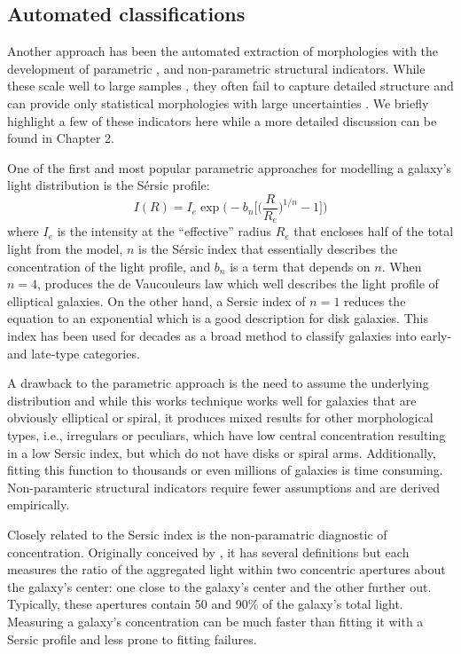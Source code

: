 \subsection{Automated classifications}
Another approach has been the automated extraction of morphologies with the development of parametric \citep{Sersic1968, Odewahn2002, Peng2002}, and non-parametric 
\citep{Abraham1994, 
	   Conselice2003, 
	   Abraham2003, 
	   Lotz2004,  
	   Freeman2013} 
structural indicators. While these scale well to large samples 
\citep[e.g.,][]{Simard2011, 
			Griffith2012, 
			Casteels2014, 
			Holwerda2014, 
			Meert2016}, 
they often fail to capture detailed structure and can provide only statistical morphologies with large uncertainties \cite[e.g.,][]{Abraham1996, Bershady2000}. We briefly highlight a few of these indicators here while a more detailed discussion can be found in Chapter 2. 

One of the first and most popular parametric approaches for modelling a galaxy's light distribution is the S\'ersic profile:
\begin{equation}
I(R) = I_e \exp \Big(-b_n\Big[\Big(\frac{R}{R_e}\Big)^{1/n}-1\Big]\Big)
\end{equation}
where $I_e$ is the intensity at the ``effective'' radius $R_e$ that encloses half of the total light from the model, $n$ is the S\'ersic index that essentially describes the concentration of the light profile, and $b_n$ is a term that depends on $n$. When $n=4$, produces the de Vaucouleurs law which well describes the light profile of elliptical galaxies. On the other hand, a Sersic index of $n=1$ reduces the equation to an exponential which is a good description for disk galaxies. This index has been used for decades as a broad method to classify galaxies into early- and late-type categories. 

A drawback to the parametric approach is the need to assume the underlying distribution and while this works technique works well for galaxies that are obviously elliptical or spiral, it produces mixed results for other morphological types, i.e., irregulars or peculiars, which have low central concentration resulting in a low Sersic index, but which do not have disks or spiral arms. Additionally, fitting this function to thousands or even millions of galaxies is time consuming. Non-paramteric structural indicators require fewer assumptions and are derived empirically.

Closely related to the Sersic index is the non-paramatric diagnostic of concentration. Originally conceived by \cite{Abraham1996}, it has several definitions but each measures the ratio of the aggregated light within two concentric apertures about the galaxy's center: one close to the galaxy's center and the other further out. Typically, these apertures contain 50 and 90\% of the galaxy's total light. Measuring a galaxy's concentration can be much faster than fitting it with a Sersic profile and less prone to fitting failures. 

